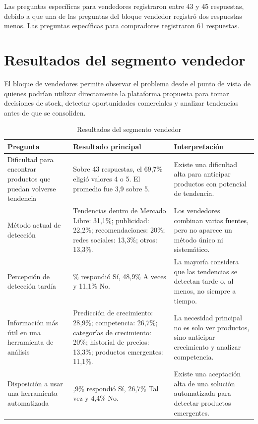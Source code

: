 Las preguntas específicas para vendedores registraron entre 43 y 45 respuestas, debido a que una de las preguntas del bloque vendedor registró dos respuestas menos. Las preguntas específicas para compradores registraron 61 respuestas.

\section{Resultados del segmento vendedor}

El bloque de vendedores permite observar el problema desde el punto de vista de quienes podrían utilizar directamente la plataforma propuesta para tomar decisiones de stock, detectar oportunidades comerciales y analizar tendencias antes de que se consoliden.

\begin{table}[ht]
	\centering
	\caption{Resultados del segmento vendedor}
	\label{tab:resultados-vendedor}
	\begin{tabularx}{\textwidth}{@{}>{\raggedright\arraybackslash}p{3.8cm} >{\raggedright\arraybackslash}p{5.5cm} X@{}}
		\toprule
		\textbf{Pregunta} & \textbf{Resultado principal} & \textbf{Interpretación} \\
		\midrule
		Dificultad para encontrar productos que puedan volverse tendencia & Sobre 43 respuestas, el 69,7\% eligió valores 4 o 5. El promedio fue 3,9 sobre 5. & Existe una dificultad alta para anticipar productos con potencial de tendencia. \\
		Método actual de detección & Tendencias dentro de Mercado Libre: 31,1\%; publicidad: 22,2\%; recomendaciones: 20\%; redes sociales: 13,3\%; otros: 13,3\%. & Los vendedores combinan varias fuentes, pero no aparece un método único ni sistemático. \\
		Percepción de detección tardía & 40\% respondió Sí, 48,9\% A veces y 11,1\% No. & La mayoría considera que las tendencias se detectan tarde o, al menos, no siempre a tiempo. \\
		Información más útil en una herramienta de análisis & Predicción de crecimiento: 28,9\%; competencia: 26,7\%; categorías de crecimiento: 20\%; historial de precios: 13,3\%; productos emergentes: 11,1\%. & La necesidad principal no es solo ver productos, sino anticipar crecimiento y analizar competencia. \\
		Disposición a usar una herramienta automatizada & 68,9\% respondió Sí, 26,7\% Tal vez y 4,4\% No. & Existe una aceptación alta de una solución automatizada para detectar productos emergentes. \\
		\bottomrule
	\end{tabularx}
\end{table}

